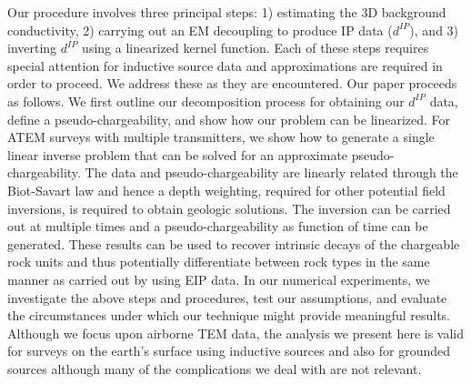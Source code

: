 \documentclass[a4paper, 11pt]{article}
\newcommand{\dip}{d^{IP}}
\begin{document}
Our procedure involves three principal steps: 1) estimating the 3D background conductivity, 2) carrying out an EM decoupling to produce IP data ($\dip$), and 3) inverting $\dip$ using a linearized kernel  function. Each of these steps requires special attention for inductive source data and approximations are required in order to proceed. We address these as they are encountered. Our paper proceeds as follows. We first outline our decomposition process for obtaining our $\dip$ data, define a pseudo-chargeability, and  show how our problem can be linearized. For ATEM surveys  with multiple transmitters, we show how to generate a single linear inverse problem that can be solved for an approximate pseudo-chargeability. The data and  pseudo-chargeability are linearly related through the Biot-Savart law and hence a depth weighting, required for other potential field inversions, is required to obtain geologic solutions. The inversion can be carried out at multiple times and a pseudo-chargeability as function of time can be generated. These results can be used to recover intrinsic decays of the chargeable rock units and thus potentially differentiate between rock types in the same manner as carried out by \cite{Yuval1997} using EIP data. In our numerical experiments, we investigate the above steps and procedures, test our assumptions, and evaluate the circumstances under which our technique might provide meaningful results. Although  we focus upon airborne TEM data, the analysis we present here is valid for surveys on the earth’s surface using inductive sources and also for grounded sources although many of the complications we deal with are not relevant. 
    
\end{document}
